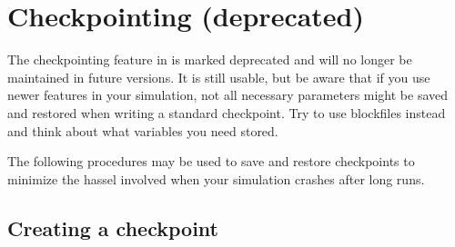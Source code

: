 \section{Checkpointing (deprecated)}

The checkpointing feature in \es{} is marked deprecated and will no
longer be maintained in future versions. It is still usable, but be
aware that if you use newer features in your simulation, not all
necessary parameters might be saved and restored when writing a
standard checkpoint. Try to use blockfiles instead and think about
what variables you need stored.

The following procedures may be used to save and restore checkpoints
to minimize the hassel involved when your simulation crashes after
long runs.

\subsection{Creating a checkpoint}


